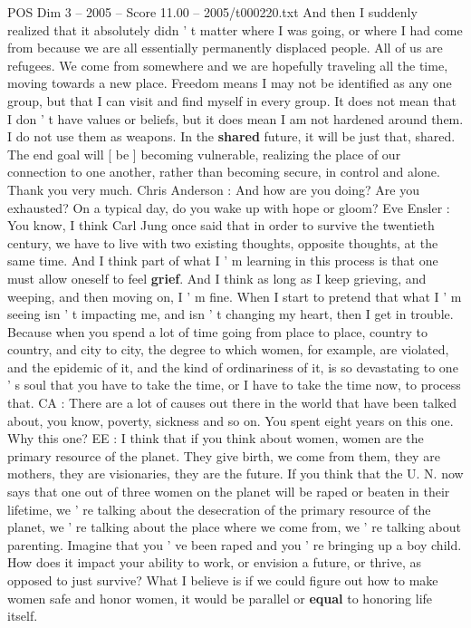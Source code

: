 \begin{textsample}{POS Dim 3 – 2005 – Score 11.00 – 2005/t000220.txt}
And then I suddenly realized that it absolutely didn ' t matter where I was going, or where I had come from because we are all essentially permanently displaced people.
All of us are refugees.
We come from somewhere and we are hopefully traveling all the time, moving towards a new place.
Freedom means I may not be identified as any one group, but that I can visit and find myself in every group.
It does not mean that I don ' t have values or beliefs, but it does mean I am not hardened around them.
I do not use them as weapons.
In the \textbf{shared} future, it will be just that, shared.
The end goal will [ be ] becoming vulnerable, realizing the place of our connection to one another, rather than becoming secure, in control and alone.
Thank you very much.
Chris Anderson : And how are you doing?
Are you exhausted?
On a typical day, do you wake up with hope or gloom?
Eve Ensler : You know, I think Carl Jung once said that in order to survive the twentieth century, we have to live with two existing thoughts, opposite thoughts, at the same time.
And I think part of what I ' m learning in this process is that one must allow oneself to feel \textbf{grief}.
And I think as long as I keep grieving, and weeping, and then moving on, I ' m fine.
When I start to pretend that what I ' m seeing isn ' t impacting me, and isn ' t changing my heart, then I get in trouble.
Because when you spend a lot of time going from place to place, country to country, and city to city, the degree to which women, for example, are violated, and the epidemic of it, and the kind of ordinariness of it, is so devastating to one ' s soul that you have to take the time, or I have to take the time now, to process that.
CA : There are a lot of causes out there in the world that have been talked about, you know, poverty, sickness and so on.
You spent eight years on this one.
Why this one?
EE : I think that if you think about women, women are the primary resource of the planet.
They give birth, we come from them, they are mothers, they are visionaries, they are the future.
If you think that the U.
N. now says that one out of three women on the planet will be raped or beaten in their lifetime, we ' re talking about the desecration of the primary resource of the planet, we ' re talking about the place where we come from, we ' re talking about parenting.
Imagine that you ' ve been raped and you ' re bringing up a boy child.
How does it impact your ability to work, or envision a future, or thrive, as opposed to just survive?
What I believe is if we could figure out how to make women safe and honor women, it would be parallel or \textbf{equal} to honoring life itself.

\end{textsample}

